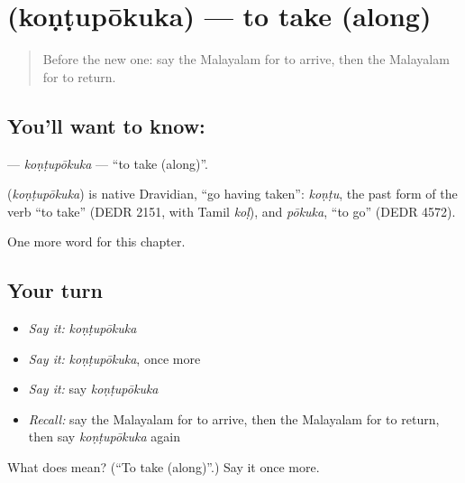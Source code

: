\section[\texorpdfstring{\ml{കൊണ്ടുപോകുക} (koṇṭupōkuka)}{കൊണ്ടുപോകുക (koṇṭupōkuka)}]{ (koṇṭupōkuka) — to take (along)}

\label{lesson:ML-C225-kontupokuka}



\begin{quote}
Before the new one: say the Malayalam for to arrive, then the Malayalam for to return.
\end{quote}

\subsection*{You'll want to know: }
\textbf{} — \emph{koṇṭupōkuka} — \textquotedblleft{}to take (along)\textquotedblright{}.

\begin{cousinweb}
\textbf{} (\emph{koṇṭupōkuka}) is native Dravidian, \textquotedblleft{}go having taken\textquotedblright{}: \emph{koṇṭu}, the past form of the verb \textquotedblleft{}to take\textquotedblright{} (DEDR 2151, with Tamil \emph{koḷ}), and \emph{pōkuka}, \textquotedblleft{}to go\textquotedblright{} (DEDR 4572).
\end{cousinweb}

\begin{grammarlens}[title={What you've built}]
One more word for this chapter.
\end{grammarlens}

\subsection*{Your turn}
\begin{itemize}
\raggedright
  \item \emph{Say it:} \emph{koṇṭupōkuka}
  \item \emph{Say it:} \emph{koṇṭupōkuka}, once more
  \item \emph{Say it:} say \emph{koṇṭupōkuka}
  \item \emph{Recall:} say the Malayalam for to arrive, then the Malayalam for to return, then say \emph{koṇṭupōkuka} again
\end{itemize}

\begin{tcolorbox}[breakable,colback=teal!4,colframe=teal!35!black,title={Before you move on}]
What does  mean? (\textquotedblleft{}To take (along)\textquotedblright{}.) Say it once more.
\end{tcolorbox}
